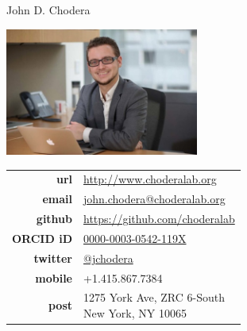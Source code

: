 \documentclass[10pt]{article}
\begin{document}
\reversemarginpar
{\selectfont \LARGE John D. Chodera}\\[1cm]

\vspace{-0.5in}

\begin{minipage}[t]{2.5in}
\includegraphics[width=2.5in,valign=c]{images/john_chodera_wide.jpg}
\end{minipage}
\quad
\begin{minipage}[t]{3in}
\small
\begin{tabular}{rl}
{\bf url} & \href{http://www.choderalab.org}{http://www.choderalab.org}\\[0.05in]
{\bf email} & \href{mailto:choderaj@mskcc.org}{\href{mailto:john.chodera@choderalab.org}{john.chodera@choderalab.org}}\\[0.05in]
{\bf github} & \href{https://github.com/choderalab}{https://github.com/choderalab}\\[0.05in]
{\bf ORCID iD} & \href{http://orcid.org/0000-0003-0542-119X}{0000-0003-0542-119X}\\[0.05in]
{\bf twitter} & \href{http://twitter.com/jchodera}{@jchodera}\\[0.05in]
{\bf mobile} & +1.415.867.7384\\[0.05in]
{\bf post} & 
\parbox[t]{3.0in}{%
1275 York Ave, ZRC 6-South\\
New York, NY 10065}
\end{tabular}
\end{minipage}

\end{document}
